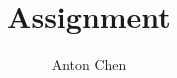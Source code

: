 \title{Assignment}
\author{Anton Chen}
\newcommand{\CourseCode}{MATH 418}
\newcommand{\CourseName}{Probability}
\newcommand{\School}{The University of British Columbia}
\newcommand{\Location}{Vancouver, B.C.}
